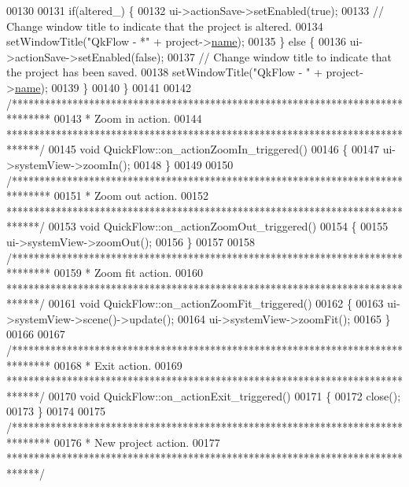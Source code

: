 \begin{DoxyCode}
00130 
00131   \textcolor{keywordflow}{if}(altered\_) \{
00132     ui->actionSave->setEnabled(\textcolor{keyword}{true});
00133     \textcolor{comment}{// Change window title to indicate that the project is altered.}
00134     setWindowTitle(\textcolor{stringliteral}{"QkFlow - *"} + project->\hyperlink{class_project_a82dd2d1bc38f9fd08c9a811fcaa76b38}{name});
00135   \} \textcolor{keywordflow}{else} \{
00136     ui->actionSave->setEnabled(\textcolor{keyword}{false});
00137     \textcolor{comment}{// Change window title to indicate that the project has been saved.}
00138     setWindowTitle(\textcolor{stringliteral}{"QkFlow - "} + project->\hyperlink{class_project_a82dd2d1bc38f9fd08c9a811fcaa76b38}{name});
00139   \}
00140 \}
00141 
00142 \textcolor{comment}{/*******************************************************************************}
00143 \textcolor{comment}{ * Zoom in action.}
00144 \textcolor{comment}{ ******************************************************************************/}
00145 \textcolor{keywordtype}{void} QuickFlow::on\_actionZoomIn\_triggered()
00146 \{
00147   ui->systemView->zoomIn();
00148 \}
00149 
00150 \textcolor{comment}{/*******************************************************************************}
00151 \textcolor{comment}{ * Zoom out action.}
00152 \textcolor{comment}{ ******************************************************************************/}
00153 \textcolor{keywordtype}{void} QuickFlow::on\_actionZoomOut\_triggered()
00154 \{
00155   ui->systemView->zoomOut();
00156 \}
00157 
00158 \textcolor{comment}{/*******************************************************************************}
00159 \textcolor{comment}{ * Zoom fit action.}
00160 \textcolor{comment}{ ******************************************************************************/}
00161 \textcolor{keywordtype}{void} QuickFlow::on\_actionZoomFit\_triggered()
00162 \{
00163   ui->systemView->scene()->update();
00164   ui->systemView->zoomFit();
00165 \}
00166 
00167 \textcolor{comment}{/*******************************************************************************}
00168 \textcolor{comment}{ * Exit action.}
00169 \textcolor{comment}{ ******************************************************************************/}
00170 \textcolor{keywordtype}{void} QuickFlow::on\_actionExit\_triggered()
00171 \{
00172   close();
00173 \}
00174 
00175 \textcolor{comment}{/*******************************************************************************}
00176 \textcolor{comment}{ * New project action.}
00177 \textcolor{comment}{ ******************************************************************************/}

\end{DoxyCode}
